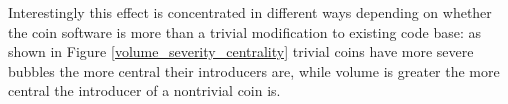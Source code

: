 


Interestingly this effect is concentrated in different ways depending on whether the coin software is more than a trivial modification to existing code base: as shown in Figure \ref{volume_severity_centrality} trivial coins have more severe bubbles the more central their introducers are, while volume is greater the more central the introducer of a nontrivial coin is.


